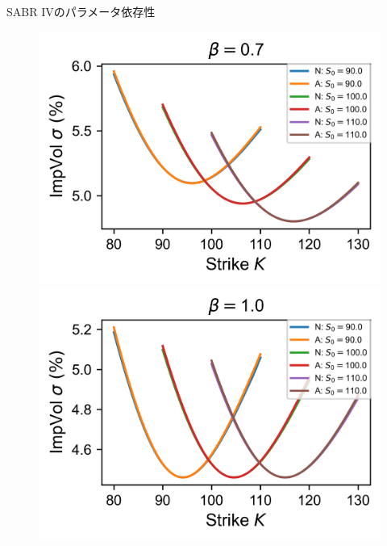 \documentclass[dvipdfmx,9pt]{beamer}
\begin{document}
\begin{frame}{SABR IVのパラメータ依存性}
  \begin{figure}
    \begin{minipage}[b]{0.48\linewidth}
      \raggedleft
      \includegraphics[width=0.7\linewidth]{image/beta/SABR_graph_0.7.png}
    \end{minipage}
    \hfill
    \begin{minipage}[b]{0.48\linewidth}
      \raggedright
      \includegraphics[width=0.7\linewidth]{image/beta/SABR_graph_1.0.png}
    \end{minipage}
  \end{figure}

\end{frame}
\end{document}
